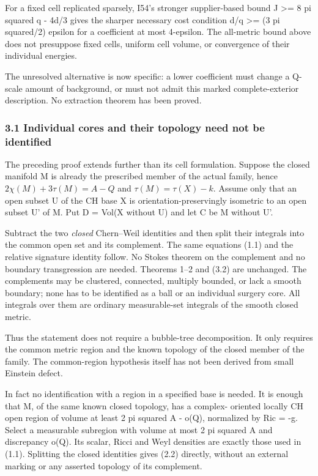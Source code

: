 \documentclass[
  10pt,
]{article}
\begin{document}
For a fixed cell replicated sparsely, I54's stronger supplier-based
bound J \textgreater= 8 pi squared q - 4d/3 gives the sharper necessary
cost condition d/q \textgreater= (3 pi squared/2) epsilon for a
coefficient at most 4-epsilon. The all-metric bound above does not
presuppose fixed cells, uniform cell volume, or convergence of their
individual energies.

The unresolved alternative is now specific: a lower coefficient must
change a Q-scale amount of background, or must not admit this marked
complete-exterior description. No extraction theorem has been proved.

\hypertarget{individual-cores-and-their-topology-need-not-be-identified}{%
\subsubsection{3.1 Individual cores and their topology need not be
identified}\label{individual-cores-and-their-topology-need-not-be-identified}}

The preceding proof extends further than its cell formulation. Suppose
the closed manifold M is already the prescribed member of the actual
family, hence \(2\chi(M)+3\tau(M)=A-Q\) and \(\tau(M)=\tau(X)-k\).
Assume only that an open subset U of the CH base X is
orientation-preservingly isometric to an open subset U' of M. Put D =
Vol(X without U) and let C be M without U'.

Subtract the two \emph{closed} Chern--Weil identities and then split
their integrals into the common open set and its complement. The same
equations (1.1) and the relative signature identity follow. No Stokes
theorem on the complement and no boundary transgression are needed.
Theorems 1--2 and (3.2) are unchanged. The complements may be clustered,
connected, multiply bounded, or lack a smooth boundary; none has to be
identified as a ball or an individual surgery core. All integrals over
them are ordinary measurable-set integrals of the smooth closed metric.

Thus the statement does not require a bubble-tree decomposition. It only
requires the common metric region and the known topology of the closed
member of the family. The common-region hypothesis itself has not been
derived from small Einstein defect.

In fact no identification with a region in a specified base is needed.
It is enough that M, of the same known closed topology, has a complex-
oriented locally CH open region of volume at least 2 pi squared A -
o(Q), normalized by Ric = -g. Select a measurable subregion with volume
at most 2 pi squared A and discrepancy o(Q). Its scalar, Ricci and Weyl
densities are exactly those used in (1.1). Splitting the closed
identities gives (2.2) directly, without an external marking or any
asserted topology of its complement.
\end{document}

